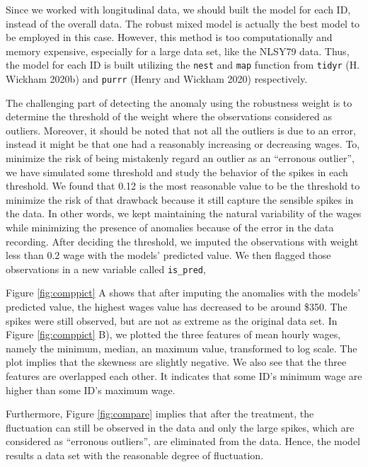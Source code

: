 \documentclass{article}
\begin{document}
Since we worked with longitudinal data, we should built the model for each ID, instead of the overall data. The robust mixed model is actually the best model to be employed in this case. However, this method is too computationally and memory expensive, especially for a large data set, like the NLSY79 data. Thus, the model for each ID is built utilizing the \texttt{nest} and \texttt{map} function from \texttt{tidyr} (H. Wickham 2020b) and \texttt{purrr} (Henry and Wickham 2020) respectively.

The challenging part of detecting the anomaly using the robustness weight is to determine the threshold of the weight where the observations considered as outliers. Moreover, it should be noted that not all the outliers is due to an error, instead it might be that one had a reasonably increasing or decreasing wages. To, minimize the risk of being mistakenly regard an outlier as an ``erronous outlier'', we have simulated some threshold and study the behavior of the spikes in each threshold. We found that 0.12 is the most reasonable value to be the threshold to minimize the risk of that drawback because it still capture the sensible spikes in the data. In other words, we kept maintaining the natural variability of the wages while minimizing the presence of anomalies because of the error in the data recording. After deciding the threshold, we imputed the observations with weight less than 0.2 wage with the models' predicted value. We then flagged those observations in a new variable called \texttt{is\_pred},

Figure \ref{fig:comppict} A shows that after imputing the anomalies with the models' predicted value, the highest wages value has decreased to be around \$350. The spikes were still observed, but are not as extreme as the original data set. In Figure \ref{fig:comppict} B), we plotted the three features of mean hourly wages, namely the minimum, median, an maximum value, transformed to log scale. The plot implies that the skewness are slightly negative. We also see that the three features are overlapped each other. It indicates that some ID's minimum wage are higher than some ID's maximum wage.

Furthermore, Figure \ref{fig:compare} implies that after the treatment, the fluctuation can still be observed in the data and only the large spikes, which are considered as ``erronous outliers'', are eliminated from the data. Hence, the model results a data set with the reasonable degree of fluctuation.
\end{document}
